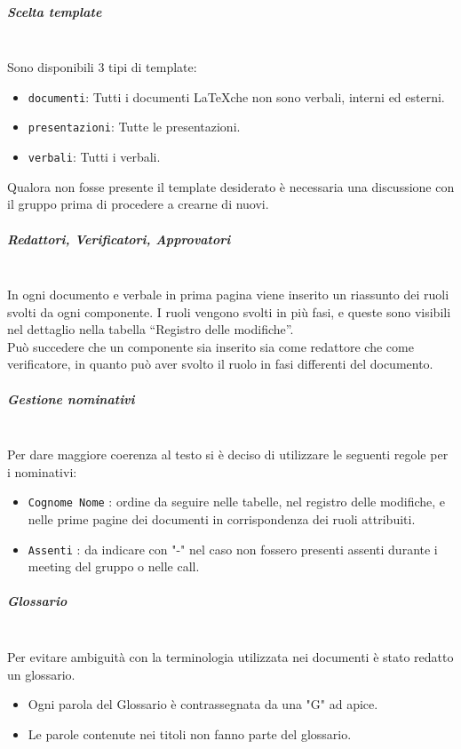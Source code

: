 \subparagraph{Scelta template}
\mbox{}\\
Sono disponibili 3 tipi di template:
\begin{itemize}
    \item \texttt{documenti}: Tutti i documenti \LaTeX \space che non sono verbali, interni ed esterni.
    \item \texttt{presentazioni}: Tutte le presentazioni.
    \item \texttt{verbali}: Tutti i verbali.
\end{itemize}
Qualora non fosse presente il template desiderato è necessaria una discussione con il gruppo prima di procedere a crearne di nuovi.

\subparagraph{Redattori, Verificatori, Approvatori}
\mbox{}\\
In ogni documento e verbale in prima pagina viene inserito un riassunto dei ruoli svolti da ogni componente. 
I ruoli vengono svolti in più fasi, e queste sono visibili nel dettaglio nella tabella ``Registro delle modifiche''.\\ 
Può succedere che un componente sia inserito sia come redattore che come verificatore, in quanto può aver svolto il ruolo in fasi differenti del documento.

\subparagraph{Gestione nominativi}
\mbox{}\\
Per dare maggiore coerenza al testo si è deciso di utilizzare le seguenti regole per i nominativi:
\begin{itemize}
	\item \texttt{Cognome Nome} : ordine da seguire nelle tabelle, nel registro delle modifiche, e nelle prime pagine dei documenti in corrispondenza dei ruoli attribuiti.
	\item \texttt{Assenti} : da indicare con "-" nel caso non fossero presenti assenti durante i meeting del gruppo o nelle call.
\end{itemize}

\subparagraph{Glossario}
\mbox{}\\
Per evitare ambiguità con la terminologia utilizzata nei documenti è stato redatto un glossario.
\begin{itemize}
    \item Ogni parola del Glossario è contrassegnata da una "G" ad apice.
    \item Le parole contenute nei titoli non fanno parte del glossario.
\end{itemize}

